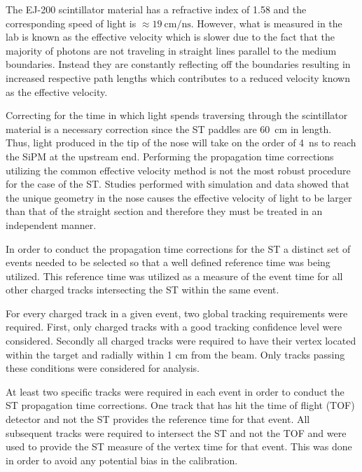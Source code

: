 The EJ-200 scintillator material has a refractive index of 1.58 \cite{ej200_specs} and the corresponding speed of light is $\approx \mathrm{19\ cm/ns}$.  However, what is measured in the lab is known as the effective velocity which is slower due to the fact that the majority of photons are not traveling in straight lines parallel to the medium boundaries.  Instead they are constantly reflecting off the boundaries resulting in increased respective path lengths which contributes to a reduced velocity known as the effective velocity.  

Correcting for the time in which light spends traversing through the scintillator material is a necessary correction since the ST paddles are 60~cm in length.  Thus, light produced in the tip of the nose will take on the order of 4~ns to reach the SiPM at the upstream end.  Performing the propagation time corrections utilizing the common effective velocity method is not the most robust procedure for the case of the ST.  Studies performed with simulation and data showed that the unique geometry in the nose causes the effective velocity of light to be larger than that of the straight section and therefore they must be treated in an independent manner.

In order to conduct the propagation time corrections for the ST a distinct set of events needed to be selected so that a well defined reference time was being utilized.  This reference time was utilized as a measure of the event time for all other charged tracks intersecting the ST within the same event.  

For every charged track in a given event, two global tracking requirements were required.  First, only charged tracks with a good tracking confidence level were considered.  Secondly all charged tracks were required to have their vertex located within the target and radially within 1 cm from the beam. Only tracks passing these conditions were considered for analysis.

At least two specific tracks were required in each event in order to conduct the ST propagation time corrections.  One track that has hit the time of flight (TOF) detector and not the ST provides the reference time for that event.  All subsequent tracks were required to intersect the ST and not the TOF and were used to provide the ST measure of the vertex time for that event.  This was done in order to avoid any potential bias in the calibration.  
	

